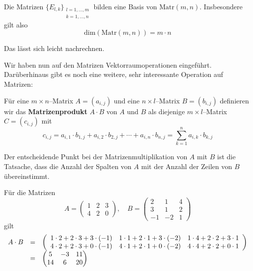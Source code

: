 \begin{satz} Die Matrizen $\{E_{l,k}\}_{\begin{smallmatrix} l = 1, \ldots, m \\ k = 1, \ldots, n 
\end{smallmatrix}}$ 
bilden eine Basis von $\textrm{Matr}(m,n)$. Insbesondere gilt also 
  	$$ \textrm{dim}(\textrm{Matr}(m,n)) = m \cdot n $$
\end{satz}

\beweis Das lässt sich leicht nachrechnen.

Wir haben nun auf den Matrizen Vektorraumoperationen eingeführt. Darüberhinaus gibt es noch eine 
weitere, sehr interessante Operation auf Matrizen:

\begin{definition} Für eine $m \times n$--Matrix $A = \left( a_{i,j} \right)$ und eine 
$n \times l$--Matrix $B = \left( b_{i,j} \right)$ definieren wir das  
\textbf{Matrizenprodukt} $A \cdot B$ von $A$ und $B$ als diejenige $m \times l$--Matrix $C = \left( 
c_{i,j} \right)$ mit 
  	$$ c_{i,j} = a_{i,1} \cdot b_{1,j} + a_{i,2} \cdot b_{2,j} + \cdots + a_{i,n} \cdot b_{n,j} = 
	\sum_{k = 1}^n a_{i,k} \cdot b_{k,j} $$
\end{definition}

\begin{notiz} Der entscheidende Punkt bei der Matrizenmultiplikation von $A$ mit $B$ ist die Tatsache, 
dass die Anzahl der Spalten von $A$ mit der Anzahl der Zeilen von $B$ übereinstimmt.
\end{notiz}

\begin{beispiel} Für die Matrizen 
  	$$ A = \left( \begin{matrix}  1 & 2 & 3 \\ 4 & 2 & 0\end{matrix} \right), \quad B 
	=  \left( \begin{matrix}  2 & 1 & 4 \\ 3 & 1 & 2 \\ -1 & -2 & 1	\end{matrix} \right) $$
gilt 
  	$$ \begin{array} {l c l} 
  	A \cdot B & = & \left( \begin{array} { c c c }
 	1 \cdot 2 + 2 \cdot 3 + 3 \cdot (-1) & 1 \cdot 1 + 2 \cdot 1 + 3 \cdot (-2) &
 	1 \cdot 4 + 2 \cdot 2 + 3 \cdot 1 \\
	4 \cdot 2 + 2 \cdot 3 + 0 \cdot (-1) & 4 \cdot 1 + 2 \cdot 1 + 0 \cdot (-2) &
	4 \cdot 4 + 2 \cdot 2 + 0 \cdot 1 
 	\end{array} \right) \\
  	& = & \left( \begin{matrix}
	5 & -3 & 11 \\ 14 & 6 & 20 
 	\end{matrix} \right) 
  \end{array} $$
\end{beispiel}

